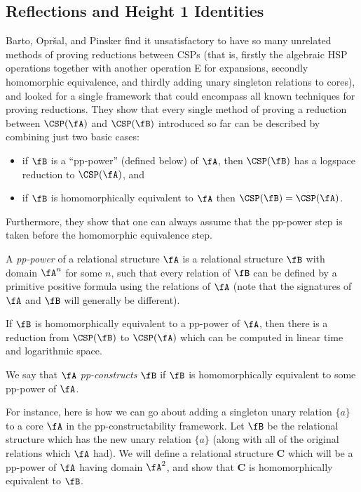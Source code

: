 \subsection{Reflections and Height 1 Identities}

Barto, Opr{\v{s}}al, and Pinsker \cite{barto-reflections} find it unsatisfactory to have so many unrelated methods of proving reductions between CSPs (that is, firstly the algebraic HSP operations together with another operation E for expansions, secondly homomorphic equivalence, and thirdly adding unary singleton relations to cores), and looked for a single framework that could encompass all known techniques for proving reductions. They show that every single method of proving a reduction between $\CSP(\fA)$ and $\CSP(\fB)$ introduced so far can be described by combining just two basic cases:
\begin{itemize}
\item if $\fB$ is a ``pp-power'' (defined below) of $\fA$, then $\CSP(\fB)$ has a logspace reduction to $\CSP(\fA)$, and

\item if $\fB$ is homomorphically equivalent to $\fA$ then $\CSP(\fB) = \CSP(\fA)$.
\end{itemize}
Furthermore, they show that one can always assume that the pp-power step is taken before the homomorphic equivalence step.

\begin{defn} A \emph{pp-power} of a relational structure $\fA$ is a relational structure $\fB$ with domain $\fA^n$ for some $n$, such that every relation of $\fB$ can be defined by a primitive positive formula using the relations of $\fA$ (note that the signatures of $\fA$ and $\fB$ will generally be different).
\end{defn}

\begin{prop} If $\fB$ is homomorphically equivalent to a pp-power of $\fA$, then there is a reduction from $\CSP(\fB)$ to $\CSP(\fA)$ which can be computed in linear time and logarithmic space.%
\end{prop}

\begin{defn}\label{defn-pp-construct} We say that $\fA$ \emph{pp-constructs} $\fB$ if $\fB$ is homomorphically equivalent to some pp-power of $\fA$.
\end{defn}

For instance, here is how we can go about adding a singleton unary relation $\{a\}$ to a core $\fA$ in the pp-constructability framework. Let $\fB$ be the relational structure which has the new unary relation $\{a\}$ (along with all of the original relations which $\fA$ had). We will define a relational structure $\mathbf{C}$ which will be a pp-power of $\fA$ having domain $\fA^2$, and show that $\mathbf{C}$ is homomorphically equivalent to $\fB$.


